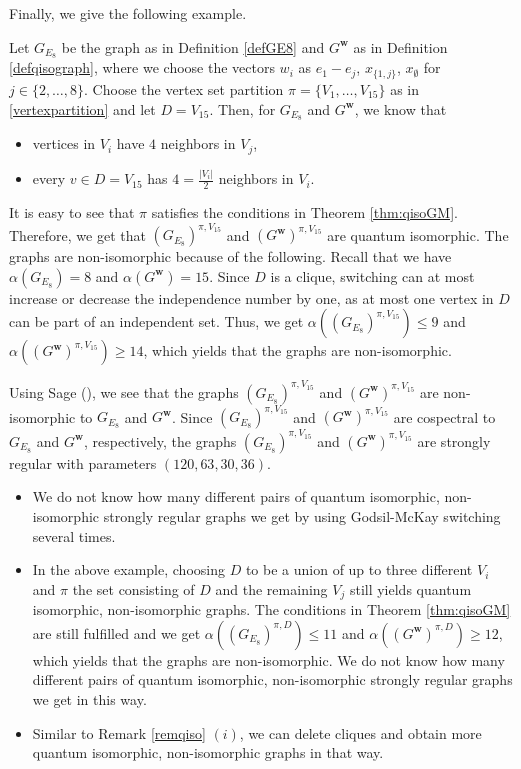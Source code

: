 Finally, we give the following example. 

\begin{exam}
Let $G_{E_8}$ be the graph as in Definition \ref{defGE8} and $G^{\boldsymbol{w}}$ as in Definition \ref{defqisograph}, where we choose the vectors $w_i$ as $e_1-e_j$, $x_{\{1,j\}}$, $x_{\emptyset}$ for $j \in \{2,\dots, 8\}$. Choose the vertex set partition $\pi=\{V_1, \dots, V_{15}\}$ as in \eqref{vertexpartition} and let $D=V_{15}$. Then, for $G_{E_8}$ and $G^{\boldsymbol{w}}$, we know that 
\begin{itemize}
    \item[(i)] vertices in $V_i$ have $4$ neighbors in $V_j$,
    \item[(ii)] every $v\in D=V_{15}$ has $4=\frac{|V_i|}{2}$ neighbors in $V_i$. 
\end{itemize}
It is easy to see that $\pi$ satisfies the conditions in Theorem \ref{thm:qisoGM}. Therefore, we get that $(G_{E_8})^{\pi, V_{15}}$ and $(G^{\boldsymbol{w}})^{\pi, V_{15}}$ are quantum isomorphic. The graphs are non-isomorphic because of the following. Recall that we have $\alpha(G_{E_8})=8$ and $\alpha(G^{\boldsymbol{w}})=15$. Since $D$ is a clique, switching can at most increase or decrease the independence number by one, as at most one vertex in $D$ can be part of an independent set. Thus, we get $\alpha((G_{E_8})^{\pi, V_{15}})\leq 9$ and $\alpha((G^{\boldsymbol{w}})^{\pi, V_{15}})\geq 14$, which yields that the graphs are non-isomorphic. 

Using Sage (\cite{sagemath}), we see that the graphs $(G_{E_8})^{\pi, V_{15}}$ and $(G^{\boldsymbol{w}})^{\pi, V_{15}}$ are non-isomorphic to $G_{E_8}$ and $G^{\boldsymbol{w}}$. Since $(G_{E_8})^{\pi, V_{15}}$ and $(G^{\boldsymbol{w}})^{\pi, V_{15}}$ are cospectral to $G_{E_8}$ and $G^{\boldsymbol{w}}$, respectively, the graphs $(G_{E_8})^{\pi, V_{15}}$ and $(G^{\boldsymbol{w}})^{\pi, V_{15}}$ are strongly regular with parameters $(120, 63, 30, 36)$. 
\end{exam}

\begin{rema}
\begin{itemize}
    \item[(i)] We do not know how many different pairs of quantum isomorphic, non-isomorphic strongly regular graphs we get by using Godsil-McKay switching several times. 
    \item[(ii)] In the above example, choosing $D$ to be a union of up to three different $V_i$ and $\pi$ the set consisting of $D$ and the remaining $V_j$ still yields quantum isomorphic, non-isomorphic graphs. The conditions in Theorem \ref{thm:qisoGM} are still fulfilled and we get $\alpha((G_{E_8})^{\pi, D})\leq 11$ and $\alpha((G^{\boldsymbol{w}})^{\pi, D})\geq 12$, which yields that the graphs are non-isomorphic. We do not know how many different pairs of quantum isomorphic, non-isomorphic strongly regular graphs we get in this way. 
    \item[(iii)] Similar to Remark \ref{remqiso} $(i)$, we can delete cliques and obtain more quantum isomorphic, non-isomorphic graphs in that way. 
\end{itemize}
\end{rema}
